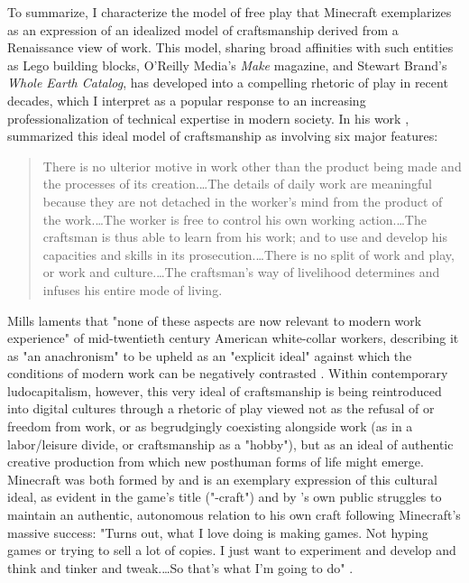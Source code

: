 To summarize, I characterize the model of free play that Minecraft exemplarizes as an expression of an idealized model of craftsmanship derived from a Renaissance view of work. This model, sharing broad affinities with such entities as Lego building blocks, O'Reilly Media's \emph{Make} magazine, and Stewart Brand's \emph{Whole Earth Catalog}, has developed into a compelling rhetoric of play in recent decades, which I interpret as a popular response to an increasing professionalization of technical expertise in modern society. In his  work , \citeauthor{Mills1951} summarized this ideal model of craftsmanship as involving six major features:
\blockcquote[220]{Mills1951}{
  There is no ulterior motive in work other than the product being made and the processes of its creation.…The details of daily work are meaningful because they are not detached in the worker's mind from the product of the work.…The worker is free to control his own working action.…The craftsman is thus able to learn from his work; and to use and develop his capacities and skills in its prosecution.…There is no split of work and play, or work and culture.…The craftsman's way of livelihood determines and infuses his entire mode of living.
}
Mills laments that "none of these aspects are now relevant to modern work experience" of mid-twentieth century American white-collar workers, describing it as "an anachronism" to be upheld as an "explicit ideal" against which the conditions of modern work can be negatively contrasted \autocite[224]{Mills1951}. Within contemporary ludocapitalism, however, this very ideal of craftsmanship is being reintroduced into digital cultures through a rhetoric of play viewed not as the refusal of or freedom from work, or as begrudgingly coexisting alongside work (as in a labor/leisure divide, or craftsmanship as a "hobby"), but as an ideal of authentic creative production from which new posthuman forms of life might emerge. Minecraft was both formed by and is an exemplary expression of this cultural ideal, as evident in the game's title ("-craft") and by \citeauthor{Persson-cave}'s own public struggles to maintain an authentic, autonomous relation to his own craft following Minecraft's massive success: "Turns out, what I love doing is making games. Not hyping games or trying to sell a lot of copies. I just want to experiment and develop and think and tinker and tweak.…So that's what I'm going to do" \autocite*{Persson2013-todo}.

